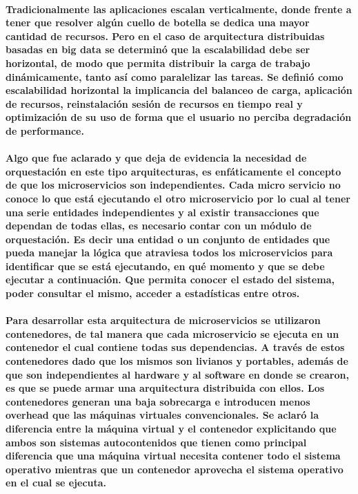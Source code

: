 \paragraph{
    Tradicionalmente las aplicaciones escalan verticalmente, donde frente a tener que resolver algún cuello de botella se dedica una mayor cantidad de recursos.
    Pero en el caso de arquitectura distribuidas basadas en big data se determinó que la escalabilidad debe ser horizontal, de modo que permita distribuir la carga de trabajo dinámicamente, tanto así como paralelizar las tareas.
    Se definió como escalabilidad horizontal la implicancia del balanceo de carga, aplicación de recursos, reinstalación sesión de recursos en tiempo real y optimización de su uso de forma que el usuario no perciba degradación de performance.
}

\paragraph{
    Algo que fue aclarado y que deja de evidencia la necesidad de orquestación en este tipo arquitecturas, es enfáticamente el concepto de que los microservicios son independientes.
    Cada micro servicio no conoce lo que está ejecutando el otro microservicio por lo cual al tener una serie entidades independientes y al existir transacciones que dependan de todas ellas, es necesario contar con un módulo de orquestación.
    Es decir una entidad o un conjunto de entidades que pueda manejar la lógica que atraviesa todos los microservicios para identificar que se está ejecutando, en qué momento y que se debe ejecutar a continuación.
    Que permita conocer el estado del sistema, poder consultar el mismo, acceder a estadísticas entre otros.
}

\paragraph{
    Para desarrollar esta arquitectura de microservicios se utilizaron contenedores, de tal manera que cada microservicio se ejecuta en un contenedor el cual contiene todas sus dependencias.
    A través de estos contenedores dado que los mismos son livianos y portables, además de que son independientes al hardware y al software en donde se crearon, es que se puede armar una arquitectura distribuida con ellos.
    Los contenedores generan una baja sobrecarga e introducen menos overhead que las máquinas virtuales convencionales.
    Se aclaró la diferencia entre la máquina virtual y el contenedor explicitando que ambos son sistemas autocontenidos que tienen como principal diferencia que una máquina virtual necesita contener todo el sistema operativo mientras que un contenedor aprovecha el sistema operativo en el cual se ejecuta.
}

